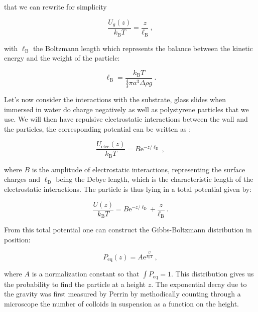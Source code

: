 that we can rewrite for simplicity

\begin{equation}
	\frac{U_g(z)}{k_\mathrm{B} T} = \frac{z}{\ell_\mathrm{B}}~,
\end{equation}

with $\ell_\mathrm{B}$ the Boltzmann length which represents the balance between the kinetic energy and the weight of the particle:

\begin{equation}
	\ell_\mathrm{B} = \frac{k_\mathrm{B} T}{ \frac{4}{3} \pi a^3 \Delta \rho g}~.
\end{equation}

Let's now consider the interactions with the substrate, glass slides when immersed in water do charge negatively as well as polystyrene particles that we use. We will then have repulsive electrostatic interactions between the wall and the particles, the corresponding potential can be written as  \cite{israelachvili_intermolecular_2015}:

\begin{equation}
	\frac{U_\mathrm{elec}(z)}{k_\mathrm{B}T} = B \mathrm{e}^{-z/\ell_\mathrm{D}}~,
\end{equation}


where $B$ is the amplitude of electrostatic interactions, representing the surface charges and $\ell_\mathrm{D}$ being the Debye length, which is the characteristic length of the electrostatic interactions. The particle is thus lying in a total potential given by:

\begin{equation}
	\frac{U(z)}{k_\mathrm{B}T} =   B \mathrm{e}^{-z/\ell_\mathrm{D}} +  \frac{z}{\ell_\mathrm{B}}~.
\end{equation}

From this total potential one can construct the Gibbs-Boltzmann distribution in position:

\begin{equation}
	P_\mathrm{eq}(z) = A\mathrm{e}^
	{
		\frac{U}{k_\mathrm{B}T}	
	}~,
	\label{Eq:Peq}
\end{equation}

where $A$ is a normalization constant so that $\int P_\mathrm{eq} = 1$. This distribution gives us the probability to find the particle at a height $z$. The exponential decay due to the gravity was first measured by Perrin \cite{perrin_les_2014} by methodically counting through a microscope the number of colloids in suspension as a function on the height. 


